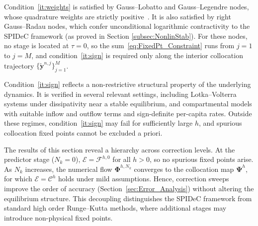 \documentclass[a4paper,num-refs]{oup-contemporary-spidec}
\newtheorem{remark}[theorem]{Remark}
\begin{document}
    Condition~\ref{it:weights} is satisfied by Gauss--Lobatto and Gauss--Legendre nodes, whose quadrature weights are strictly positive~\cite{Quarteroni_2007}. It is also satisfied by right Gauss--Radau nodes, which confer unconditional logarithmic contractivity to the SPIDeC framework (as proved in Section \ref{subsec:NonlinStab}). For these nodes, no stage is located at $\tau=0$, so the sum~\eqref{eq:FixedPt_Constraint} runs from $j=1$ to $j=M$, and condition~\ref{it:sign} is required only along the interior collocation trajectory $\{\tilde{\bm{y}}^{n,j}\}_{j=1}^M$.
    
    Condition~\ref{it:sign} reflects a non-restrictive structural property of the underlying dynamics. It is verified in several relevant settings, including Lotka--Volterra systems under dissipativity near a stable equilibrium, and compartmental models with suitable inflow and outflow terms and sign-definite per-capita rates.
    Outside these regimes, condition~\ref{it:sign} may fail for sufficiently large $h$, and spurious collocation fixed points cannot be excluded a priori.

The results of this section reveal a hierarchy across correction levels. At the predictor stage ($N_k=0$), $\mathcal{E}=\mathcal{F}^{h,0}$ for all $h>0$, so no spurious fixed points arise. As $N_k$ increases, the numerical flow $\bm{\Phi}^{h,N_k}$ converges to the collocation map $\bm{\Psi}^h$, for which $\mathcal{E}=\mathcal{C}^h$ holds under mild assumptions. Hence, correction sweeps improve the order of accuracy (Section~\ref{sec:Error_Analysis}) without altering the equilibrium structure. This decoupling distinguishes the SPIDeC framework from standard high order Runge--Kutta methods, where additional stages may introduce non-physical fixed points.
\end{document}
